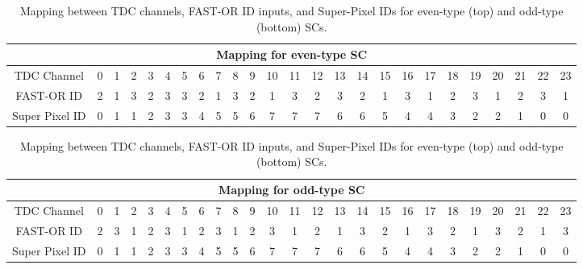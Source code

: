 			\begin{table}[h]
    			\centering
    			\setlength{\tabcolsep}{4pt}
    			\scriptsize
    			\begin{tabular}{|c|*{24}{c|}}
    				\hline 
    				\multicolumn{25}{|c|}{\textbf{Mapping for even-type SC}} \\
       			 	\hline
        			TDC Channel 
        			& 0 & 1 & 2 & 3 & 4 & 5 & 6 & 7 & 8 & 9 & 10 & 11 
        			& 12 & 13 & 14 & 15 & 16 & 17 & 18 & 19 & 20 & 21 & 22 & 23 \\
        			\hline
        			FAST-OR ID 
        			& \cellcolor{fo2}2 & \cellcolor{fo1}1 & \cellcolor{fo3}3 & \cellcolor{fo2}2 & \cellcolor{fo3}3 & \cellcolor{fo3}3 & \cellcolor{fo2}2 & \cellcolor{fo1}1 & \cellcolor{fo3}3 & \cellcolor{fo2}2 & \cellcolor{fo1}1 & \cellcolor{fo3}3 
        			& \cellcolor{fo2}2 & \cellcolor{fo3}3 & \cellcolor{fo2}2 & \cellcolor{fo1}1 & \cellcolor{fo3}3 & \cellcolor{fo1}1 & \cellcolor{fo2}2 & \cellcolor{fo3}3 & \cellcolor{fo1}1 & \cellcolor{fo2}2 & \cellcolor{fo3}3 & \cellcolor{fo1}1 \\
        			\hline
        			Super Pixel ID 
       			 	& 0 & 1 & 1 & 2 & 3 & 3 & 4 & 5 & 5 & 6 & 7 & 7 
       				& 7 & 6 & 6 & 5 & 4 & 4 & 3 & 2 & 2 & 1 & 0 & 0 \\
        			\hline
    			\end{tabular}
    
    			\vspace{4mm}
    
    			\begin{tabular}{|c|*{24}{c|}}
       				\hline 
    				\multicolumn{25}{|c|}{\textbf{Mapping for odd-type SC}} \\
    				\hline
        			TDC Channel 
        			& 0 & 1 & 2 & 3 & 4 & 5 & 6 & 7 & 8 & 9 & 10 & 11 
        			& 12 & 13 & 14 & 15 & 16 & 17 & 18 & 19 & 20 & 21 & 22 & 23 \\
        			\hline
        			FAST-OR ID 
        			& \cellcolor{fo2}2 & \cellcolor{fo3}3 & \cellcolor{fo1}1 & \cellcolor{fo2}2 & \cellcolor{fo3}3 & \cellcolor{fo1}1 & \cellcolor{fo2}2 & \cellcolor{fo3}3 & \cellcolor{fo1}1 & \cellcolor{fo2}2 & \cellcolor{fo3}3 & \cellcolor{fo1}1 
        			& \cellcolor{fo2}2 & \cellcolor{fo1}1 & \cellcolor{fo3}3 & \cellcolor{fo2}2 & \cellcolor{fo1}1 & \cellcolor{fo3}3 & \cellcolor{fo2}2 & \cellcolor{fo1}1 & \cellcolor{fo3}3 & \cellcolor{fo2}2 & \cellcolor{fo1}1 & \cellcolor{fo3}3 \\
        			\hline
        			Super Pixel ID 
        			& 0 & 1 & 1 & 2 & 3 & 3 & 4 & 5 & 5 & 6 & 7 & 7 
        			& 7 & 6 & 6 & 5 & 4 & 4 & 3 & 2 & 2 & 1 & 0 & 0 \\
        			\hline
    			\end{tabular}
    			\caption{Mapping between TDC channels, FAST-OR ID inputs, and Super-Pixel IDs for even-type (top) and odd-type (bottom) SCs.}
    			\label{tab:tdc_fastor_map}
			\end{table}
			
